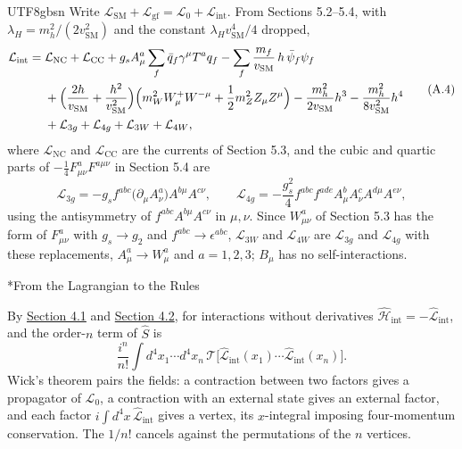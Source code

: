 \documentclass[11pt,a4paper,oneside]{report}
\makeatletter
\newcommand\topic{\@startsection{paragraph}{4}{\z@}{-1.7ex plus -.3ex}{.5ex}{\normalfont\normalsize\bfseries\itshape\boldmath}*}
\makeatother
\begin{document}
\begin{CJK*}{UTF8}{gbsn}
Write $\mathcal L_{\mathrm{SM}}+\mathcal L_{\mathrm{gf}}=\mathcal L_0+\mathcal L_{\mathrm{int}}$. From Sections 5.2--5.4, with $\lambda_H=m_h^2/(2v_{\mathrm{SM}}^2)$ and the constant $\lambda_Hv_{\mathrm{SM}}^4/4$ dropped,
\begin{equation*}
\begin{aligned}
\mathcal L_{\mathrm{int}}={}&\mathcal L_{\mathrm{NC}}+\mathcal L_{\mathrm{CC}}
+g_sA^a_\mu\sum_{f}\bar q_f\gamma^\mu T^aq_f
-\sum_f\frac{m_f}{v_{\mathrm{SM}}}\,h\,\bar\psi_f\psi_f\\
&+\Bigl(\frac{2h}{v_{\mathrm{SM}}}+\frac{h^2}{v_{\mathrm{SM}}^2}\Bigr)\Bigl(m_W^2W^+_\mu W^{-\mu}+\frac12m_Z^2Z_\mu Z^\mu\Bigr)
-\frac{m_h^2}{2v_{\mathrm{SM}}}h^3-\frac{m_h^2}{8v_{\mathrm{SM}}^2}h^4\\
&+\mathcal L_{3g}+\mathcal L_{4g}+\mathcal L_{3W}+\mathcal L_{4W},
\end{aligned}
\tag{A.4}\label{eq:A.4}
\end{equation*}
where $\mathcal L_{\mathrm{NC}}$ and $\mathcal L_{\mathrm{CC}}$ are the currents of Section 5.3, and the cubic and quartic parts of $-\frac14F^a_{\mu\nu}F^{a\mu\nu}$ in Section 5.4 are
\begin{equation*}
\mathcal L_{3g}=-g_sf^{abc}\bigl(\partial_\mu A^a_\nu\bigr)A^{b\mu}A^{c\nu},\qquad
\mathcal L_{4g}=-\frac{g_s^2}4f^{abc}f^{ade}A^b_\mu A^c_\nu A^{d\mu}A^{e\nu},
\tag{A.5}\label{eq:A.5}
\end{equation*}
using the antisymmetry of $f^{abc}A^{b\mu}A^{c\nu}$ in $\mu,\nu$. Since $W^a_{\mu\nu}$ of Section 5.3 has the form of $F^a_{\mu\nu}$ with $g_s\to g_2$ and $f^{abc}\to\epsilon^{abc}$, $\mathcal L_{3W}$ and $\mathcal L_{4W}$ are $\mathcal L_{3g}$ and $\mathcal L_{4g}$ with these replacements, $A^a_\mu\to W^a_\mu$ and $a=1,2,3$; $B_\mu$ has no self-interactions.

\topic{From the Lagrangian to the Rules}

By \hyperref[interaction-picture]{Section 4.1} and \hyperref[s-matrix-and-wick-theorem]{Section 4.2}, for interactions without derivatives $\hat{\mathcal H}_{\mathrm{int}}=-\hat{\mathcal L}_{\mathrm{int}}$, and the order-$n$ term of $\hat S$ is
\begin{equation*}
\frac{i^n}{n!}\int d^4x_1\cdots d^4x_n\,\mathcal T\bigl[\hat{\mathcal L}_{\mathrm{int}}(x_1)\cdots\hat{\mathcal L}_{\mathrm{int}}(x_n)\bigr].
\tag{A.6}\label{eq:A.6}
\end{equation*}
Wick's theorem pairs the fields: a contraction between two factors gives a propagator of $\mathcal L_0$, a contraction with an external state gives an external factor, and each factor $i\int d^4x\,\hat{\mathcal L}_{\mathrm{int}}$ gives a vertex, its $x$-integral imposing four-momentum conservation. The $1/n!$ cancels against the permutations of the $n$ vertices.


\end{CJK*}
\end{document}
